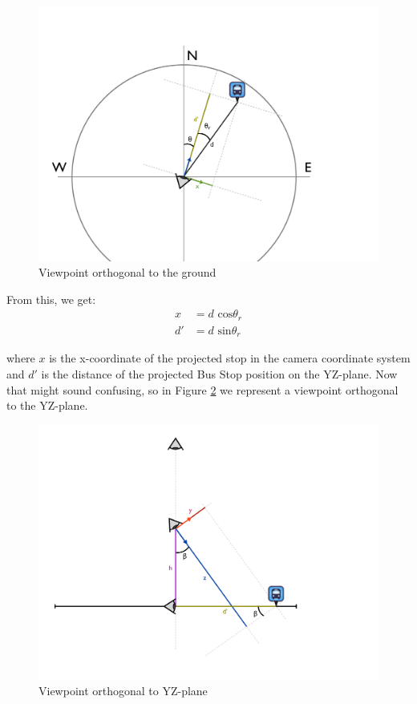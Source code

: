 \begin{figure}[ht]
\center
\includegraphics[scale=0.4]{pics/view_point_azimuth}
\caption{Viewpoint orthogonal to the ground}
\label{fig:view_point_azimuth}
\end{figure}

From this, we get:
\begin{align} 
x 	&= 	d\textrm{ cos}\theta_r\\
d' 	&= 	d\textrm{ sin}\theta_r
\end{align}

where $x$ is the x-coordinate of the projected stop in the camera coordinate system and $d'$ is the distance of the projected Bus Stop position on the YZ-plane. Now that might sound confusing, so in Figure \ref{fig:view_point_vertical} we represent a viewpoint orthogonal to the YZ-plane.

\clearpage

\begin{figure}[ht]
\center
\includegraphics[scale=0.4]{pics/view_point_vertical}
\caption{Viewpoint orthogonal to YZ-plane}
\label{fig:view_point_vertical}
\end{figure}

